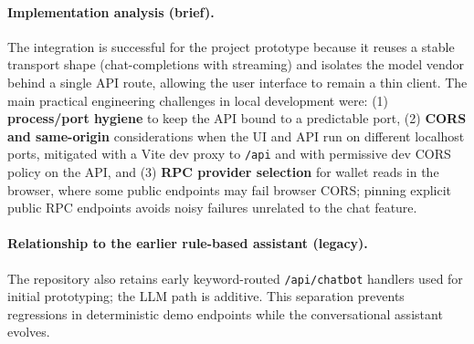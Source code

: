 \documentclass[12pt, a4paper]{report}
\begin{document}
\paragraph{Implementation analysis (brief).}
The integration is successful for the project prototype because it reuses a stable transport shape (chat-completions with streaming) and isolates the model vendor behind a single API route, allowing the user interface to remain a thin client. The main practical engineering challenges in local development were: (1) \textbf{process/port hygiene} to keep the API bound to a predictable port, (2) \textbf{CORS and same-origin} considerations when the UI and API run on different localhost ports, mitigated with a Vite dev proxy to \texttt{/api} and with permissive dev CORS policy on the API, and (3) \textbf{RPC provider selection} for wallet reads in the browser, where some public endpoints may fail browser CORS; pinning explicit public RPC endpoints avoids noisy failures unrelated to the chat feature.

\paragraph{Relationship to the earlier rule-based assistant (legacy).}
The repository also retains early keyword-routed \texttt{/api/chatbot} handlers used for initial prototyping; the LLM path is additive. This separation prevents regressions in deterministic demo endpoints while the conversational assistant evolves.
\end{document}
